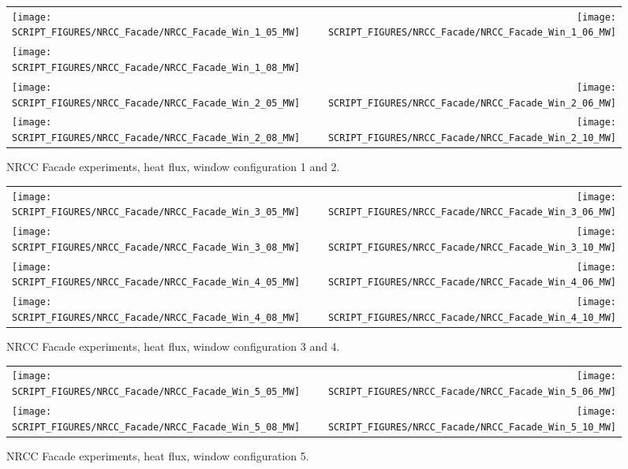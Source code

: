 \begin{figure}[p]
\begin{tabular*}{\textwidth}{l@{\extracolsep{\fill}}r}
\texttt{[image: SCRIPT\_FIGURES/NRCC\_Facade/NRCC\_Facade\_Win\_1\_05\_MW]} &
\texttt{[image: SCRIPT\_FIGURES/NRCC\_Facade/NRCC\_Facade\_Win\_1\_06\_MW]} \\
\texttt{[image: SCRIPT\_FIGURES/NRCC\_Facade/NRCC\_Facade\_Win\_1\_08\_MW]} &
  \\
\texttt{[image: SCRIPT\_FIGURES/NRCC\_Facade/NRCC\_Facade\_Win\_2\_05\_MW]} &
\texttt{[image: SCRIPT\_FIGURES/NRCC\_Facade/NRCC\_Facade\_Win\_2\_06\_MW]} \\
\texttt{[image: SCRIPT\_FIGURES/NRCC\_Facade/NRCC\_Facade\_Win\_2\_08\_MW]} &
\texttt{[image: SCRIPT\_FIGURES/NRCC\_Facade/NRCC\_Facade\_Win\_2\_10\_MW]}
\end{tabular*}
\caption[NRCC Facade experiments, heat flux, window configuration 1 and 2]{NRCC Facade experiments, heat flux, window configuration 1 and 2.}
\label{NRCC_Facade_1}
\end{figure}

\begin{figure}[p]
\begin{tabular*}{\textwidth}{l@{\extracolsep{\fill}}r}
\texttt{[image: SCRIPT\_FIGURES/NRCC\_Facade/NRCC\_Facade\_Win\_3\_05\_MW]} &
\texttt{[image: SCRIPT\_FIGURES/NRCC\_Facade/NRCC\_Facade\_Win\_3\_06\_MW]} \\
\texttt{[image: SCRIPT\_FIGURES/NRCC\_Facade/NRCC\_Facade\_Win\_3\_08\_MW]} &
\texttt{[image: SCRIPT\_FIGURES/NRCC\_Facade/NRCC\_Facade\_Win\_3\_10\_MW]} \\
\texttt{[image: SCRIPT\_FIGURES/NRCC\_Facade/NRCC\_Facade\_Win\_4\_05\_MW]} &
\texttt{[image: SCRIPT\_FIGURES/NRCC\_Facade/NRCC\_Facade\_Win\_4\_06\_MW]} \\
\texttt{[image: SCRIPT\_FIGURES/NRCC\_Facade/NRCC\_Facade\_Win\_4\_08\_MW]} &
\texttt{[image: SCRIPT\_FIGURES/NRCC\_Facade/NRCC\_Facade\_Win\_4\_10\_MW]}
\end{tabular*}
\caption[NRCC Facade experiments, heat flux, window configuration 3 and 4]{NRCC Facade experiments, heat flux, window configuration 3 and 4.}
\label{NRCC_Facade_2}
\end{figure}

\begin{figure}[p]
\begin{tabular*}{\textwidth}{l@{\extracolsep{\fill}}r}
\texttt{[image: SCRIPT\_FIGURES/NRCC\_Facade/NRCC\_Facade\_Win\_5\_05\_MW]} &
\texttt{[image: SCRIPT\_FIGURES/NRCC\_Facade/NRCC\_Facade\_Win\_5\_06\_MW]} \\
\texttt{[image: SCRIPT\_FIGURES/NRCC\_Facade/NRCC\_Facade\_Win\_5\_08\_MW]} &
\texttt{[image: SCRIPT\_FIGURES/NRCC\_Facade/NRCC\_Facade\_Win\_5\_10\_MW]}
\end{tabular*}
\caption[NRCC Facade experiments, heat flux, window configuration 5]{NRCC Facade experiments, heat flux, window configuration 5.}
\label{NRCC_Facade_3}
\end{figure}


